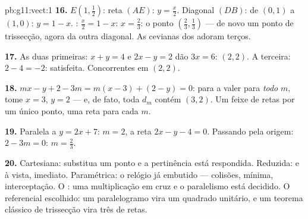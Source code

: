 \begin{solution}{pb:g11:vect:1}
\textbf{16.} $E\left(1, \frac12\right)$: reta $(AE)$:
$y = \frac x2$. Diagonal $(DB)$: de $(0,1)$ a $(1,0)$:
$y = 1 - x$. : $\frac x2 = 1 - x$: $x = \frac23$: o
ponto $\left(\frac23, \frac13\right)$ --- de novo um ponto de
trissecção, agora da outra diagonal. As cevianas dos  adoram terços.

\textbf{17.} As duas primeiras: $x + y = 4$ e $2x - y = 2$ dão
$3x = 6$: $(2, 2)$. A terceira: $2 - 4 = -2$: satisfeita.
Concorrentes em $(2, 2)$.

\textbf{18.} $mx - y + 2 - 3m = m(x - 3) + (2 - y) = 0$: para a
 valer para \emph{todo} $m$, tome $x = 3$, $y = 2$ --- e,
de fato, toda $d_m$ contém $(3, 2)$. Um feixe de retas por um
único ponto, uma reta para cada  $m$.

\textbf{19.} Paralela a $y = 2x + 7$: 
$m = 2$, a reta $2x - y - 4 = 0$. Passando pela origem:
$2 - 3m = 0$: $m = \frac23$.

\textbf{20.} Cartesiana: substitua um ponto e a pertinência
está respondida. Reduzida:  e  à vista,  imediato. Paramétrica: o relógio já
embutido --- colisões,  mínima, interceptação. O
: uma multiplicação em cruz e o paralelismo está
decidido. O referencial escolhido: um paralelogramo vira um
quadrado unitário, e um teorema clássico de trissecção vira três
 de retas.
\end{solution}
